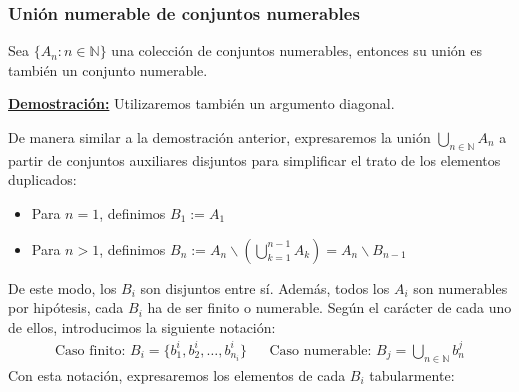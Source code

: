 \documentclass[12pt,a4paper]{article}
\newcommand{\N}{\mathbb{N}}
\newcounter{unit}[section]
\renewcommand{\theunit}{\arabic{unit}}
\renewcommand{\thesubsubsection}{\theunit.\arabic{subsubsection}}
\newcommand{\dem}{
    \noindent \underline{\textbf{Demostración:}}
}
\newcommand{\result}[1]{%
  \subsubsection{#1}%
  \label{subsubsection:\thesubsubsection}%
}
\begin{document}
\vspace{6mm}
\result{Unión numerable de conjuntos numerables}
\hspace{3mm}
Sea $\{A_n : n \in \N\}$ una colección de conjuntos numerables, entonces su unión
es también un conjunto numerable.

\vspace{4mm}
\dem Utilizaremos también un argumento diagonal.
\newpage

De manera similar a la demostración anterior, expresaremos la unión $\bigcup_{n \in \N} A_n$ a partir de conjuntos
auxiliares disjuntos para simplificar el trato de los elementos duplicados:
\vspace{-2mm}
\begin{itemize}
    \item Para $n = 1$, definimos $B_1 := A_1$
    \item Para $n > 1$, definimos $B_n := A_n \backslash \left(\bigcup_{k=1}^{n-1}A_k\right) = A_n \backslash B_{n-1}$
\end{itemize}
De este modo, los $B_i$ son disjuntos entre sí. Además, todos los $A_i$ son numerables por hipótesis, cada $B_i$ 
ha de ser finito o numerable. Según el carácter de cada uno de ellos, introducimos la siguiente notación:
\begin{align*}
    \text{Caso finito: } B_i = \big\{b^i_1, b^i_2, \ldots, b^i_{n_i} \big\} &&
    \text{Caso numerable: } B_j = \bigcup_{n \in \N}b^j_n
\end{align*}
Con esta notación, expresaremos los elementos de cada $B_i$ tabularmente:
\end{document}
